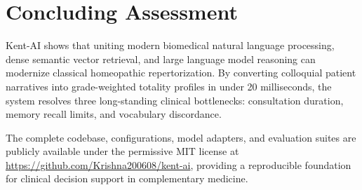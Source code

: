 
\section{Concluding Assessment}

Kent-AI shows that uniting modern biomedical natural language processing, dense semantic vector retrieval, and large language model reasoning can modernize classical homeopathic repertorization. By converting colloquial patient narratives into grade-weighted totality profiles in under 20 milliseconds, the system resolves three long-standing clinical bottlenecks: consultation duration, memory recall limits, and vocabulary discordance.

The complete codebase, configurations, model adapters, and evaluation suites are publicly available under the permissive MIT license at \url{https://github.com/Krishna200608/kent-ai}, providing a reproducible foundation for clinical decision support in complementary medicine.
